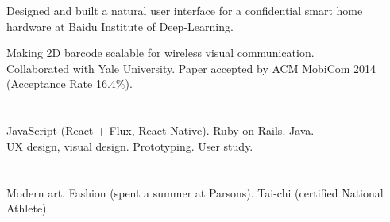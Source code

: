 \begin{resume}
\begin{position}
Designed and built a natural user interface for a confidential smart home hardware at Baidu Institute of Deep-Learning.
\end{position}

\begin{position}
Making 2D barcode scalable for wireless visual communication. \\
Collaborated with Yale University. Paper accepted by ACM MobiCom 2014 (Acceptance Rate 16.4\%).
\end{position}

\section{}
JavaScript (React + Flux, React Native). Ruby on Rails. Java. \\
UX design, visual design. Prototyping. User study.

\section{}
Modern art. Fashion (spent a summer at Parsons). Tai-chi (certified National Athlete).

\end{resume}

